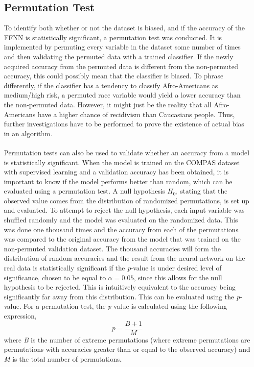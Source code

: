 \documentclass[11pt, fleqn, titlepage]{article}
\begin{document}
	\subsection{Permutation Test}\label{permutation_test}
	To identify both whether or not the dataset is biased, and if the accuracy of the FFNN is statistically significant, a permutation test was conducted. It is implemented by permuting every variable in the dataset some number of times and then validating the permuted data with a trained classifier. If the newly acquired accuracy from the permuted data is different from the non-permuted accuracy, this could possibly mean that the classifier is biased. To phrase differently, if the classifier has a tendency to classify Afro-Americans as medium/high risk, a permuted race variable would yield a lower accuracy than the non-permuted data. However, it might just be the reality that all Afro-Americans have a higher chance of recidivism than Caucasians people. Thus, further investigations have to be performed to prove the existence of actual bias in an algorithm. \\\\
	Permutation tests can also be used to validate whether an accuracy from a model is statistically significant. When the model is trained on the COMPAS dataset with supervised learning and a validation accuracy has been obtained, it is important to know if the model performs better than random, which can be evaluated using a permutation test. A null hypothesis $H_{0}$, stating that the observed value comes from the distribution of randomized permutations, is set up and evaluated. To attempt to reject the null hypothesis, each input variable was shuffled randomly and the model was evaluated on the randomized data. This was done one thousand times and the accuracy from each of the permutations was compared to the original accuracy from the model that was trained on the non-permuted validation dataset. The thousand accuracies will form the distribution of random accuracies and the result from the neural network on the real data is statistically significant if the \textit{p}-value is under desired level of significance, chosen to be equal to $ \alpha = 0.05 $, since this allows for the null hypothesis to be rejected. This is intuitively equivalent to the accuracy being significantly far away from this distribution. 
	 This can be evaluated using the \textit{p}-value. For a permutation test, the \textit{p}-value is calculated using the following expression,
	\begin{equation}\label{pval}
	p=\frac{B+1}{M}
	\end{equation}
	where \textit{B} is the number of extreme permutations (where extreme permutations are permutations with accuracies greater than or equal to the observed accuracy) and \textit{M} is the total number of permutations. \cite{p-value}
	
\end{document}
